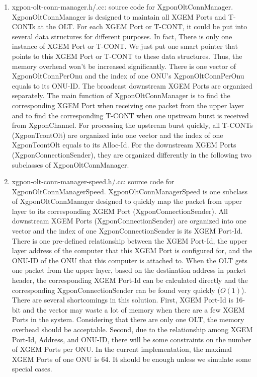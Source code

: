 \begin{enumerate}
 \item xgpon-olt-conn-manager.h/.cc: source code for {\color{red} XgponOltConnManager}. XgponOltConnManager 
is designed to maintain all XGEM Ports and T-CONTs at the OLT. For each XGEM Port or T-CONT, it could be put 
into several data structures for different purposes. In fact, There is only one instance of XGEM Port or T-CONT. 
We just put one smart pointer that points to this XGEM Port or T-CONT to these data structures. Thus, 
the memory overhead won't be increased significantly. There is one vector of XgponOltConnPerOnu and the index 
of one ONU's XgponOltConnPerOnu equals to its ONU-ID. The broadcast downstream XGEM Ports are organized separately. 
The main function of XgponOltConnManager is to find the corresponding XGEM Port when receiving one packet 
from the upper layer and to find the corresponding T-CONT when one upstream burst is received from XgponChannel. 
For processing the upstream burst quickly, all T-CONTs (XgponTcontOlt) are organized into one vector and 
the index of one XgponTcontOlt equals to its Alloc-Id. For the downstream XGEM Ports (XgponConnectionSender), 
they are organized differently in the following two subclasses of XgponOltConnManager.

 \item xgpon-olt-conn-manager-speed.h/.cc: source code for {\color{red} XgponOltConnManagerSpeed}. XgponOltConnManagerSpeed 
is one subclass of XgponOltConnManager designed to quickly map the packet from upper layer to its corresponding XGEM Port 
(XgponConnectionSender). All downstream XGEM Ports (XgponConnectionSender) are organized into one vector and the index of 
one XgponConnectionSender is its XGEM Port-Id. There is one pre-defined relationship between the XGEM Port-Id, 
the upper layer address of the computer that this XGEM Port is configured for, and the ONU-ID of the ONU that 
this computer is attached to. When the OLT gets one packet from the upper layer, based on the destination address 
in packet header, the corresponding XGEM Port-Id can be calculated directly and the corresponding XgponConnectionSender 
can be found very quickly ($O(1)$). There are several shortcomings in this solution. First, XGEM Port-Id is 16-bit 
and the vector may waste a lot of memory when there are a few XGEM Ports in the system. Considering that there 
are only one OLT, the memory overhead should be acceptable. Second, due to the relationship among XGEM Port-Id, 
Address, and ONU-ID, there will be some constraints on the number of XGEM Ports per ONU. In the current implementation, 
the maximal XGEM Ports of one ONU is 64. It should be enough unless we simulate some special cases.


\end{enumerate}
